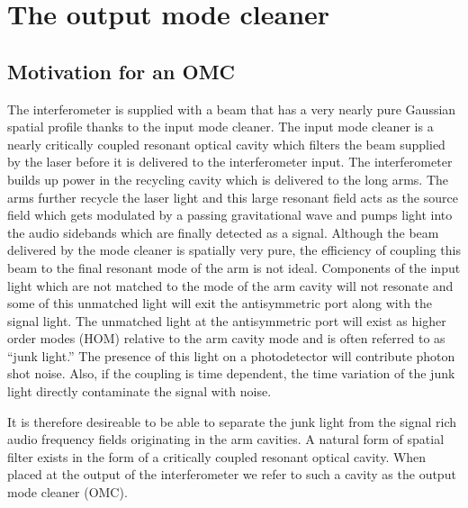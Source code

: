 \chapter{The output mode cleaner}
\label{ch:omc}

\section{Motivation for an OMC}
The interferometer is supplied with a beam that has a very nearly pure Gaussian spatial profile thanks to the input mode cleaner. %
The input mode cleaner is a nearly critically coupled resonant optical cavity which filters the beam supplied by the laser before it is delivered to the interferometer input. %
The interferometer builds up power in the recycling cavity which is delivered to the long arms. %
The arms further recycle the laser light and this large resonant field acts as the source field which gets modulated by a passing gravitational wave and pumps light into the audio sidebands which are finally detected as a signal. %
Although the beam delivered by the mode cleaner is spatially very pure, the efficiency of coupling this beam to the final resonant mode of the arm is not ideal. %
Components of the input light which are not matched to the mode of the arm cavity will not resonate and some of this unmatched light will exit the antisymmetric port along with the signal light. %
The unmatched light at the antisymmetric port will exist as higher order modes (HOM) relative to the arm cavity mode and is often referred to as ``junk light.'' %
The presence of this light on a photodetector will contribute photon shot noise. %
Also, if the coupling is time dependent, the time variation of the junk light directly contaminate the signal with noise.

It is therefore desireable to be able to separate the junk light from the signal rich audio frequency fields originating in the arm cavities. %
A natural form of spatial filter exists in the form of a critically coupled resonant optical cavity. %
When placed at the output of the interferometer we refer to such a cavity as the output mode cleaner (OMC).

